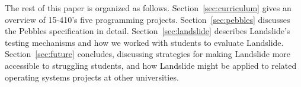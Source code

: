 
The rest of this paper is organized as follows.
Section~\ref{sec:curriculum} gives an overview of 15-410's five programming projects.
Section~\ref{sec:pebbles} discusses the Pebbles specification in detail.
Section~\ref{sec:landslide} describes Landslide's testing mechanisms and how we worked with students to evaluate Landslide.
Section~\ref{sec:future} concludes, discussing strategies for making Landslide more accessible to struggling students, and how Landslide might be applied to related operating systems projects at other universities.
